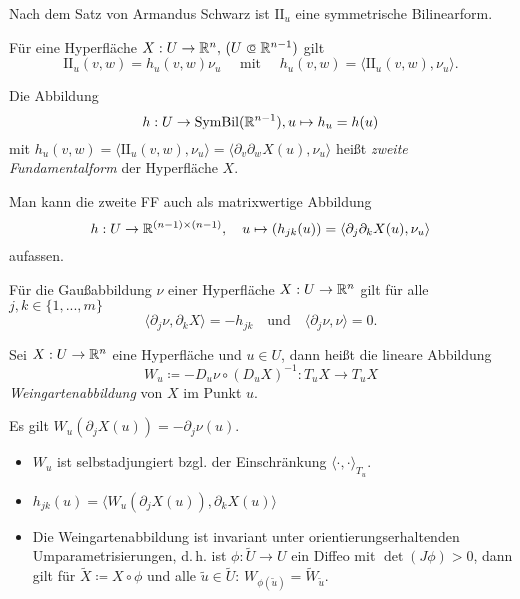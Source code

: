 \documentclass{cheat-sheet}
\newcommand{\SymBil}{\mathrm{SymBil}}
\newcommand{\II}{\mathrm{I\!I}}
\newcommand\opn{\mathrel{\ooalign{$\subset$\cr
  \hidewidth\raise.1ex\hbox{$\circ\mkern.5mu$}\cr}}}
\begin{document}
\begin{bem}
  Nach dem Satz von Armandus Schwarz ist $\II_u$ eine symmetrische Bilinearform.
\end{bem}

\begin{bem}
  Für eine Hyperfläche $X : U \to \R^n, \, (U \opn \R^{n-1})$ gilt
  \[ \II_u(v, w) = h_u(v, w) \nu_u \quad \text{ mit } \quad h_u(v, w) = \langle \II_u(v, w) , \nu_u \rangle. \]
\end{bem}

\begin{defn}
  Die Abbildung
  \[ h : U \to \SymBil(\R^{n-1}), u \mapsto h_u = h(u) \]
  mit $h_u(v, w) = \langle \II_u(v, w), \nu_u \rangle = \langle \partial_v \partial_w X(u), \nu_u \rangle$ heißt \emph{zweite Fundamentalform} der Hyperfläche $X$.
\end{defn}

\begin{bem}
  Man kann die zweite FF auch als matrixwertige Abbildung
  \[ h : U \to \mathbb{R}^{(n-1) \times (n-1)}, \quad u \mapsto (h_{jk}(u)) = \langle \partial_j \partial_k X(u), \nu_u \rangle \]
  aufassen.
\end{bem}

\begin{satz}
  Für die Gaußabbildung $\nu$ einer Hyperfläche $X : U \to \mathbb{R}^n$ gilt für alle $j, k \in \{ 1, ..., m \}$
  \[ \langle \partial_j \nu , \partial_k X \rangle = - h_{jk} \quad \text{und} \quad \langle \partial_j \nu, \nu \rangle = 0. \]
\end{satz}

\begin{defn}
  Sei $X : U \to \mathbb{R}^n$ eine Hyperfläche und $u \in U$, dann heißt die lineare Abbildung
  \[ W_u \coloneqq - D_u \nu \circ (D_u X)^{-1} : T_u X \to T_u X \]
  \emph{Weingartenabbildung} von $X$ im Punkt $u$.
\end{defn}

\begin{bem}
  Es gilt $W_u(\partial_j X(u)) = - \partial_j \nu(u)$.
\end{bem}

\begin{satz}
  \begin{itemize}
    \item $W_u$ ist selbstadjungiert bzgl. der Einschränkung $\langle \cdot , \cdot \rangle_{T_u}$.
    \item $h_{jk}(u) = \langle W_u(\partial_j X(u)), \partial_k X(u) \rangle$
    \item Die Weingartenabbildung ist invariant unter orientierungserhaltenden Umparametrisierungen, d.\,h. ist $\phi : \tilde{U} \to U$ ein Diffeo mit $\det(J\phi) > 0$, dann gilt für $\tilde{X} \coloneqq X \circ \phi$ und alle $\tilde{u} \in \tilde{U}$: $W_{\phi(\tilde{u})} = \tilde{W}_{\tilde{u}}$.
  \end{itemize}
\end{satz}
\end{document}
